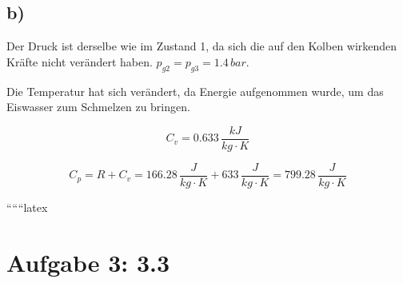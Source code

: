

\subsection*{b)}

Der Druck ist derselbe wie im Zustand 1, da sich die auf den Kolben wirkenden Kräfte nicht verändert haben. \( p_{g2} = p_{g3} = 1.4 \, bar \).

Die Temperatur hat sich verändert, da Energie aufgenommen wurde, um das Eiswasser zum Schmelzen zu bringen.

\[
C_v = 0.633 \, \frac{kJ}{kg \cdot K}
\]

\[
C_p = R + C_v = 166.28 \, \frac{J}{kg \cdot K} + 633 \, \frac{J}{kg \cdot K} = 799.28 \, \frac{J}{kg \cdot K}
\]

``````latex


\section*{Aufgabe 3: 3.3}